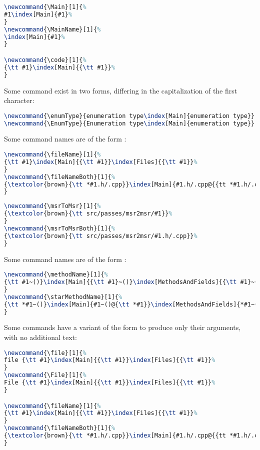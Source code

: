 \begin{lstlisting}[language=Latex]
\newcommand{\Main}[1]{%
#1\index[Main]{#1}%
}
\newcommand{\MainName}[1]{%
\index[Main]{#1}%
}

\newcommand{\code}[1]{%
{\tt #1}\index[Main]{{\tt #1}}%
}
\end{lstlisting}

Some command exist in two forms, differing in the capitalization of the first character:
\begin{lstlisting}[language=Latex]
\newcommand{\enumType}{enumeration type\index[Main]{enumeration type}}
\newcommand{\EnumType}{Enumeration type\index[Main]{enumeration type}}
\end{lstlisting}

Some command names are of the form :
\begin{lstlisting}[language=Latex]
\newcommand{\fileName}[1]{%
{\tt #1}\index[Main]{{\tt #1}}\index[Files]{{\tt #1}}%
}
\newcommand{\fileNameBoth}[1]{%
{\textcolor{brown}{\tt *#1.h/.cpp}}\index[Main]{#1.h/.cpp@{{tt *#1.h/.cpp}}}\index[Files]{#1.h/.cpp@{{tt *#1.h/.cpp}}}%
}
\end{lstlisting}

\begin{lstlisting}[language=Latex]
\newcommand{\msrToMsr}[1]{%
{\textcolor{brown}{\tt src/passes/msr2msr/#1}}%
}
\newcommand{\msrToMsrBoth}[1]{%
{\textcolor{brown}{\tt src/passes/msr2msr/#1.h/.cpp}}%
}
\end{lstlisting}

Some command names are of the form :
\begin{lstlisting}[language=Latex]
\newcommand{\methodName}[1]{%
{\tt #1~()}\index[Main]{{\tt #1}~()}\index[MethodsAndFields]{{\tt #1}~()}%
}
\newcommand{\starMethodName}[1]{%
{\tt *#1~()}\index[Main]{#1~()@{\tt *#1}}\index[MethodsAndFields]{*#1~()@{\tt *#1~()}}%
}
\end{lstlisting}

Some commands have a variant of the form  to produce only their arguments, with no additional text:
\begin{lstlisting}[language=Latex]
\newcommand{\file}[1]{%
file {\tt #1}\index[Main]{{\tt #1}}\index[Files]{{\tt #1}}%
}
\newcommand{\File}[1]{%
File {\tt #1}\index[Main]{{\tt #1}}\index[Files]{{\tt #1}}%
}

\newcommand{\fileName}[1]{%
{\tt #1}\index[Main]{{\tt #1}}\index[Files]{{\tt #1}}%
}
\newcommand{\fileNameBoth}[1]{%
{\textcolor{brown}{\tt *#1.h/.cpp}}\index[Main]{#1.h/.cpp@{{tt *#1.h/.cpp}}}\index[Files]{#1.h/.cpp@{{tt *#1.h/.cpp}}}%
}
\end{lstlisting}

